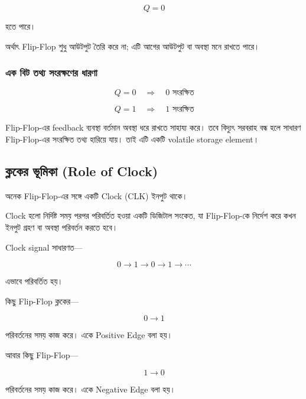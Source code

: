 \[
Q=0
\]

হতে পারে।

অর্থাৎ \textenglish{Flip-Flop} শুধু আউটপুট তৈরি করে না;
এটি আগের আউটপুট বা অবস্থা মনে রাখতে পারে।

\subsubsection*{এক বিট তথ্য সংরক্ষণের ধারণা}

\[
Q=0
\quad\Longrightarrow\quad
0\text{ সংরক্ষিত}
\]

\[
Q=1
\quad\Longrightarrow\quad
1\text{ সংরক্ষিত}
\]

\par\begingroup

\textenglish{Flip-Flop}-এর \textenglish{feedback} ব্যবস্থা
বর্তমান অবস্থা ধরে রাখতে সাহায্য করে। তবে বিদ্যুৎ সরবরাহ বন্ধ হলে
সাধারণ \textenglish{Flip-Flop}-এর সংরক্ষিত তথ্য হারিয়ে যায়।
তাই এটি একটি \textenglish{volatile storage element}।
\par\endgroup




\subsection{ক্লকের ভূমিকা
(\textenglish{Role of Clock})}

অনেক \textenglish{Flip-Flop}-এর সঙ্গে একটি
\textenglish{Clock (CLK)} ইনপুট থাকে।

\textenglish{Clock} হলো নির্দিষ্ট সময় পরপর পরিবর্তিত হওয়া একটি
ডিজিটাল সংকেত, যা \textenglish{Flip-Flop}-কে নির্দেশ করে
কখন ইনপুট গ্রহণ বা অবস্থা পরিবর্তন করতে হবে।

\textenglish{Clock signal} সাধারণত—

\[
0\rightarrow1\rightarrow0\rightarrow1\rightarrow\cdots
\]

এভাবে পরিবর্তিত হয়।

কিছু \textenglish{Flip-Flop} ক্লকের—

\[
0\rightarrow1
\]

পরিবর্তনের সময় কাজ করে। একে
\textenglish{Positive Edge} বলা হয়।

আবার কিছু \textenglish{Flip-Flop}—

\[
1\rightarrow0
\]

পরিবর্তনের সময় কাজ করে। একে
\textenglish{Negative Edge} বলা হয়।

